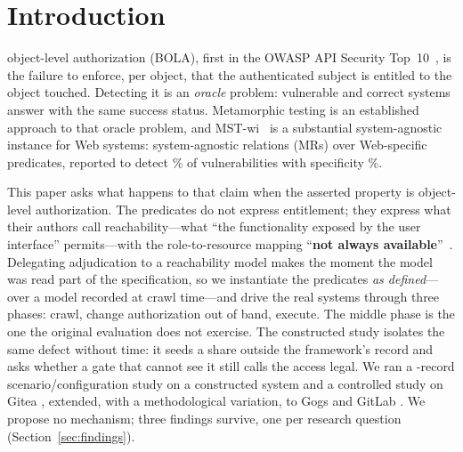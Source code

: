\section{Introduction}
\label{sec:intro}

 object-level authorization (BOLA), first in the OWASP API
Security Top~10~\cite{OWASP2023API1}, is the failure to enforce, per object, that the
authenticated subject is entitled to the object touched. Detecting it is an
\emph{oracle} problem: vulnerable and correct systems answer with the same success
status. Metamorphic testing is an established approach to that oracle problem, and
\mbox{MST-wi}~\cite{Chaleshtari2022Metamorphic} is a substantial system-agnostic
instance for Web systems: \ResLitMrCatalog{} system-agnostic relations (MRs) over
\ResLitSmrlFunctions{} Web-specific predicates, reported to detect
\ResLitReportedDetection{}\% of vulnerabilities with specificity
\ResLitReportedSpecPct{}\%.

This paper asks what happens to that claim when the asserted property is
object-level authorization. The predicates do not express entitlement; they express
what their authors call reachability---what ``the functionality exposed by the user
interface'' permits---with the role-to-resource mapping ``\textbf{not always
available}''~\cite{Chaleshtari2022Metamorphic}. Delegating adjudication to a
reachability model makes the moment the model was read part of the specification, so
we instantiate the predicates \emph{as defined}---over a model recorded at crawl
time---and drive the real systems through three phases: crawl, change authorization
out of band, execute. The middle phase is the one the original evaluation does not
exercise. The constructed study isolates the same defect without time: it seeds a
share outside the framework's record and asks whether a gate that cannot see it
still calls the access legal. We ran a \ResSynRecords{}-record
scenario/configuration study on a constructed system and a controlled study on Gitea
\ResRsVersion{}, extended, with a methodological variation, to Gogs \GgVersion{} and
GitLab \GlVersion{}. We propose no mechanism; three findings survive, one per
research question (Section~\ref{sec:findings}).

